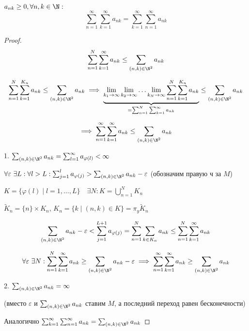   \begin{theorem}  %
    $a_{nk} \ge 0, \forall n,k \in \N: $
    $$\sum^\infty_{n=1}\sum^\infty_{k=1}a_{nk} = \sum^\infty_{k=1}\sum^\infty_{n=1}a_{nk}$$
  \end{theorem}
  \begin{proof}
    $$\sum_{n=1}^N\sum_{k=1}^\infty a_{nk} \le \sum_{(n, k) \in \N^2} a_{nk}$$

    $$\sum_{n=1}^N\sum_{k=1}^{K_n} a_{nk} \le \sum_{(n,k) \in \N^2} a_{nk} \implies \underbrace{\lim_{k_1\to\infty}\lim_{k_2\to\infty}\dotsc\lim_{k_N\to\infty} \sum^N_{n=1}\sum^{K_n}_{k=1} a_{nk}}_{ = \sum^N_{n=1}\sum^\infty_{k=1}a_{nk}} \le \sum_{(n,k) \in \N^2} a_{nk}$$

    $$\implies \sum^\infty_{n=1}\sum^\infty_{k=1}a_{nk} \le \sum_{(n,k) \in \N^2}a_{nk}$$

    1. $\sum_{(n,k)\in\N^2}a_{nk} = \sum_{l=1}^\infty a_{\varphi(l)} < \infty$

    $\forall \varepsilon \ \exists L:\forall l > L : \sum^l_{j=1}a_{\varphi(j)} > \sum_{(n,k) \in \N^2}a_{nk} - \varepsilon$ (обозначим правую ч за $M$)

    $K = \{\varphi(l)\mid l=1,\dotsc, L\} \quad \exists N: K = \bigcup^N_{n=1} K_n$

    $\widetilde K_n = \{n\}\times K_n$, $K_n = \{k \mid (n,k) \in K\} = \pi_y \widetilde K_n$

    $$\sum_{(n,k)\in\N^2}a_{nk} - \varepsilon < \sum^{L+1}_{j=1}a_{\varphi(j)} = \sum^N_{n=1}\sum_{k \in K_n} a_{nk} \le \sum^N_{n=1}\sum^\infty_{k=1} a_{nk}$$

    $$\forall \varepsilon \ \exists N : \sum^N_{n=1}\sum^\infty_{k=1} a_{nk} \ge \sum_{(n,k) \in \N^2}a_{nk} - \varepsilon \implies \sum^\infty_{n=1}\sum^\infty_{k=1} a_{nk} \ge \sum_{(n,k) \in \N^2} a_{nk}$$

    2. $\sum_{(n,k) \in\N^2} a_{nk} = \infty$

    (вместо $\varepsilon$ и $\sum_{(n,k)\in\N^2}a_{nk}$ ставим $M$, а последний переход равен бесконечности)

    Аналогично $\sum^\infty_{k=1}\sum^\infty_{n=1}a_{nk} = \sum_{(n,k)\in\N^2} a_{nk}$
  \end{proof}

